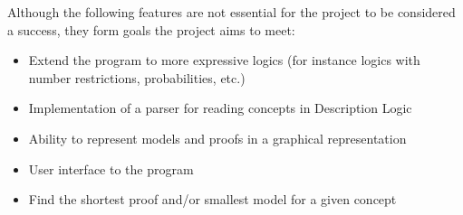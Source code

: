 
Although the following features are not essential for the project to be considered a success, they
form goals the project aims to meet:

\begin{itemize}
\item Extend the program to more expressive logics (for instance logics with number restrictions, probabilities, etc.)
\item Implementation of a parser for reading concepts in Description Logic
\item Ability to represent models and proofs in a graphical representation
\item User interface to the program
\item Find the shortest proof and/or smallest model for a given concept
\end{itemize}
